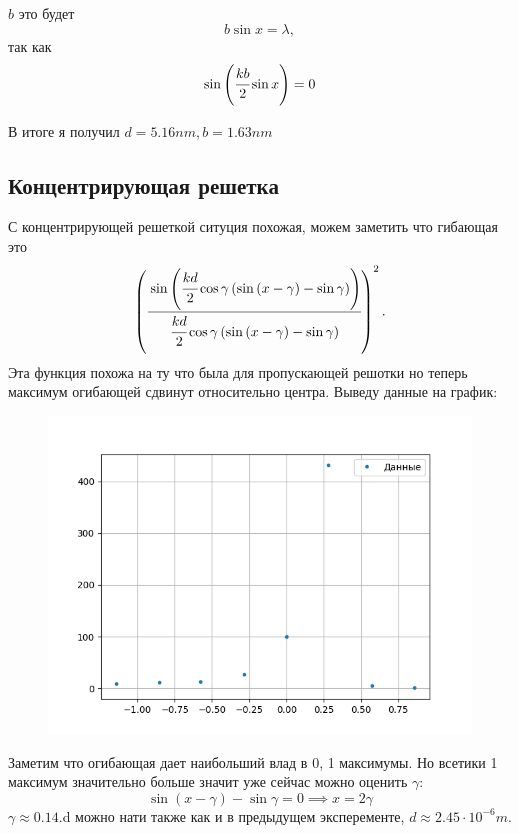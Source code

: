 $b$ это будет 
\begin{equation}
    b\sin{x} = \lambda,
\end{equation}
так как 
\begin{equation}
    \sin\left( \cfrac{kb}{2}\sin{x} \right) = 0
\end{equation}

В итоге я получил $d = 5.16 nm, b = 1.63 nm$

\subsection{Концентрирующая решетка}

С концентрирующей решеткой ситуция похожая, можем заметить что гибающая это 
\begin{equation}
    \left( \cfrac{\sin \left( \cfrac{kd}{2}\cos{\gamma} 
    \left( \sin \left( x - \gamma \right) - \sin{\gamma} \right) \right)}
    {\cfrac{kd}{2}\cos{\gamma} 
    \left( \sin \left( x - \gamma \right) - \sin{\gamma} \right)} \right)^2 .
\end{equation}
Эта функция похожа на ту что была для пропускающей решотки но теперь 
максимум огибающей сдвинут относительно центра. Выведу данные на график:
\begin{figure}[h]
    \centering
    \includegraphics[trim={0 0 0 0},clip,width=\textwidth]{Ex_2/ex_2_dat.png}
    \caption{}
    \label{Task_1_1}
\end{figure}
Заметим что огибающая дает наибольший влад в 0, 1 максимумы. Но всетики 1 максимум 
значительно больше значит уже сейчас можно оценить $\gamma$:
\begin{equation}
    \sin(x - \gamma) - \sin \gamma = 0 \implies x = 2\gamma
\end{equation}
$\gamma \approx 0.14$.d можно нати также как и в предыдущем эксперементе, 
$d \approx 2.45\cdot 10^{-6}m$.

